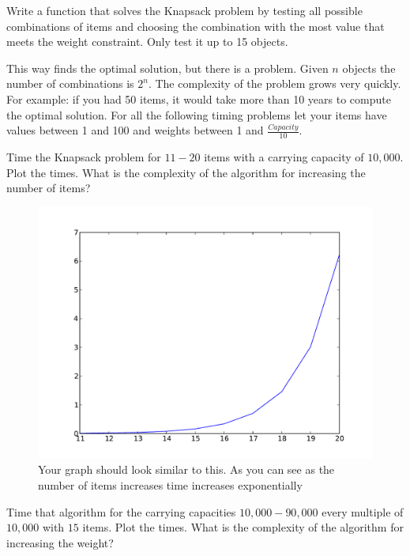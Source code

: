 \begin{problem}
Write a function that solves the Knapsack problem by testing all possible combinations of items and choosing the combination with the most value that meets the weight constraint.
Only test it up to 15 objects.
\end{problem}

This way finds the optimal solution, but there is a problem.
Given $n$ objects the number of combinations is $2^n$.
The complexity of the problem grows very quickly.
For example: if you had 50 items, it would take more than 10 years to compute the optimal solution.
For all the following timing problems let your items have values between 1 and 100 and weights between 1 and $\frac{Capacity}{10}$.

\begin{problem}
Time the Knapsack problem for $11-20$ items with a carrying capacity of $10,000$.
Plot the times.
What is the complexity of the algorithm for increasing the number of items?
\end{problem}

\begin{figure}[H]
\includegraphics[scale = .5]{naiveTime.pdf}
\caption{
Your graph should look similar to this.
As you can see as the number of items increases time increases exponentially}
\end{figure}

\begin{problem}
Time that algorithm for the carrying capacities $10,000-90,000$ every multiple of $10,000$ with $15$ items.
Plot the times.
What is the complexity of the algorithm for increasing the weight?
\end{problem}

